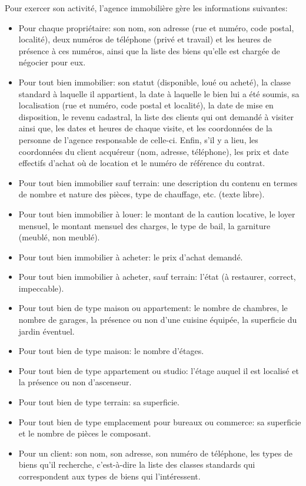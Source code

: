 Pour exercer son activité, l'agence immobilière gère les informations suivantes:
\begin{itemize}
  \item Pour chaque propriétaire: son nom, son adresse (rue et numéro, code postal, localité), deux numéros de téléphone (privé et travail) et les heures de présence à ces numéros, ainsi que la liste des biens qu'elle est chargée de négocier pour eux.
  \item Pour tout bien immobilier: son statut (disponible, loué ou acheté), la classe standard à laquelle il appartient, la date à laquelle le bien lui a été soumis, sa localisation (rue et numéro, code postal et localité), la date de mise en disposition, le revenu cadastral, la liste des clients qui ont demandé à visiter ainsi que, les dates et heures de chaque visite, et les coordonnées de la personne de l'agence responsable de celle-ci. Enfin, s'il y a lieu, les coordonnées du client acquéreur (nom, adresse, téléphone), les prix et date effectifs d'achat où de location et le numéro de référence du contrat.
  \item Pour tout bien immobilier sauf terrain: une description du contenu en termes de nombre et nature des pièces, type de chauffage, etc. (texte libre).
  \item Pour tout bien immobilier à louer: le montant de la caution locative, le loyer mensuel, le montant mensuel des charges, le type de bail, la \og{}garniture\fg{} (meublé, non meublé).
  \item Pour tout bien immobilier à acheter: le prix d'achat demandé.
  \item Pour tout bien immobilier à acheter, sauf terrain: l'état (à restaurer, correct, impeccable).
  \item Pour tout bien de type \og{}maison\fg{} ou \og{}appartement\fg{}: le nombre de chambres, le nombre de garages, la présence ou non d'une cuisine équipée, la superficie du jardin éventuel.
  \item Pour tout bien de type \og{}maison\fg{}: le nombre d'étages.
  \item Pour tout bien de type \og{}appartement\fg{} ou \og{}studio\fg{}: l'étage auquel il est localisé et la présence ou non d'ascenseur.
  \item Pour tout bien de type \og{}terrain\fg{}: sa superficie.
  \item Pour tout bien de type \og{}emplacement pour bureaux ou commerce\fg{}: sa superficie et le nombre de pièces le composant.
  \item Pour un client: son nom, son adresse, son numéro de téléphone, les types de biens qu'il recherche, c'est-à-dire la liste des classes standards qui correspondent aux types de biens qui l'intéressent.
\end{itemize}

